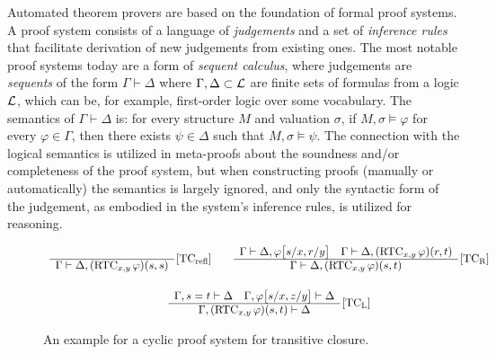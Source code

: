 Automated theorem provers are based on the foundation of formal proof systems.
A proof system consists of a language of \emph{judgements} and a set of \emph{inference rules} that facilitate derivation of new judgements from existing ones.
The most notable proof systems today are a form of \emph{sequent calculus}, where judgements are \emph{sequents} of the form $\Gamma \vdash \Delta$ where $\Gamma,\Delta \subset \mathcal{L}$ are finite sets of formulas from a logic $\mathcal{L}$, which can be, for example, first-order logic over some vocabulary.
The semantics of $\Gamma\vdash\Delta$ is: for every structure $M$ and valuation $\sigma$, if $M,\sigma\models\varphi$ for every $\varphi\in\Gamma$, then there exists $\psi\in\Delta$ such that $M,\sigma\models\psi$.
The connection with the logical semantics is utilized in meta-proofs about the soundness and/or completeness of the proof system,
but when constructing proofs (manually or automatically) the semantics is largely ignored, and only the syntactic form of the judgement, as embodied in the system's inference rules,
is utilized for reasoning.

\begin{figure}
\renewcommand\arraystretch{1.2}
\[
\begin{array}{c@{\qquad}c}
\begin{array}{c}
~ \\ \hline
\Gamma \vdash \Delta, \RTC{x,y}{\varphi}{s,s}
\end{array}
\,\rulename{TC$_\textrm{refl}$}
%
&
\begin{array}{c}
\Gamma \vdash \Delta, \varphi\big[s/x,r/y\big] \quad
\Gamma \vdash \Delta, \RTC{x,y}{\varphi}{r,t} \\ \hline
\Gamma \vdash \Delta, \RTC{x,y}{\varphi}{s,t}
\end{array}
\,\rulename{TC$_\textrm{R}$}
\\[5ex]
\multicolumn{2}{c}{
\begin{array}{c}
\Gamma, s = t \vdash \Delta \quad
\Gamma,\varphi\big[s/x,z/y\big] \vdash \Delta
\\ \hline
\Gamma,\RTC{x,y}{\varphi}{s,t}
	\vdash \Delta
\end{array}
\,\rulename{TC$_\textrm{L}$}
}
\end{array}
\]
\caption{An example for a cyclic proof system for transitive closure.}
\label{b2:tc-cyclic}
\end{figure}

